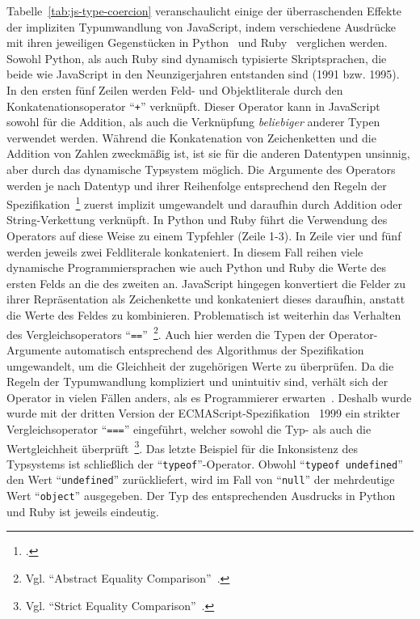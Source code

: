 Tabelle~\ref{tab:js-type-coercion} veranschaulicht einige der überraschenden Effekte der impliziten Typumwandlung von JavaScript, indem verschiedene Ausdrücke mit ihren jeweiligen Gegenstücken in Python~\autocite{PYTHON3} und Ruby~\autocite{RUBY} verglichen werden. Sowohl Python, als auch Ruby sind dynamisch typisierte Skriptsprachen, die beide wie JavaScript in den Neunzigerjahren entstanden sind (1991 bzw. 1995).\\
In den ersten fünf Zeilen werden Feld- und Objektliterale durch den Konkatenationsoperator \enquote{\texttt{+}} verknüpft. Dieser Operator kann in JavaScript sowohl für die Addition, als auch die Verknüpfung \emph{beliebiger} anderer Typen verwendet werden. Während die Konkatenation von Zeichenketten und die Addition von Zahlen zweckmäßig ist, ist sie für die anderen Datentypen unsinnig, aber durch das dynamische Typsystem möglich. Die Argumente des Operators werden je nach Datentyp und ihrer Reihenfolge entsprechend den Regeln der Spezifikation~\footcite[Abschn.~12.8.3]{ECMASCRIPT:2019} zuerst implizit umgewandelt und daraufhin durch Addition oder String-Verkettung verknüpft. In Python und Ruby führt die Verwendung des Operators auf diese Weise zu einem Typfehler (Zeile 1-3).
In Zeile vier und fünf werden jeweils zwei Feldliterale konkateniert. In diesem Fall reihen viele dynamische Programmiersprachen wie auch Python und Ruby die Werte des ersten Felds an die des zweiten an. JavaScript hingegen konvertiert die Felder zu ihrer Repräsentation als Zeichenkette und konkateniert dieses daraufhin, anstatt die Werte des Feldes zu kombinieren.
Problematisch ist weiterhin das Verhalten des Vergleichsoperators \enquote{\texttt{==}}~\footnote{Vgl. \enquote{Abstract Equality Comparison}~\autocite[Abschn. 7.2.14]{ECMASCRIPT:2019}.}. Auch hier werden die Typen der Operator-Argumente automatisch entsprechend des Algorithmus der Spezifikation umgewandelt, um die Gleichheit der zugehörigen Werte zu überprüfen. Da die Regeln der Typumwandlung kompliziert und unintuitiv sind, verhält sich der Operator in vielen Fällen anders, als es Programmierer erwarten~\autocite{PRADEL:2015}. Deshalb wurde wurde mit der dritten Version der ECMAScript-Spezifikation~\autocite{ECMASCRIPT:1999} 1999 ein strikter Vergleichsoperator \enquote{\texttt{===}} eingeführt, welcher sowohl die Typ- als auch die Wertgleichheit überprüft~\footnote{Vgl. \enquote{Strict Equality Comparison}~\autocite[Abschn. 7.2.15]{ECMASCRIPT:2019}.}.
Das letzte Beispiel für die Inkonsistenz des Typsystems ist schließlich der \enquote{\texttt{typeof}}-Operator. Obwohl \enquote{\texttt{typeof undefined}} den Wert \enquote{\texttt{undefined}} zurückliefert, wird im Fall von \enquote{\texttt{null}} der mehrdeutige Wert \enquote{\texttt{object}} ausgegeben. Der Typ des entsprechenden Ausdrucks in Python und Ruby ist jeweils eindeutig.

